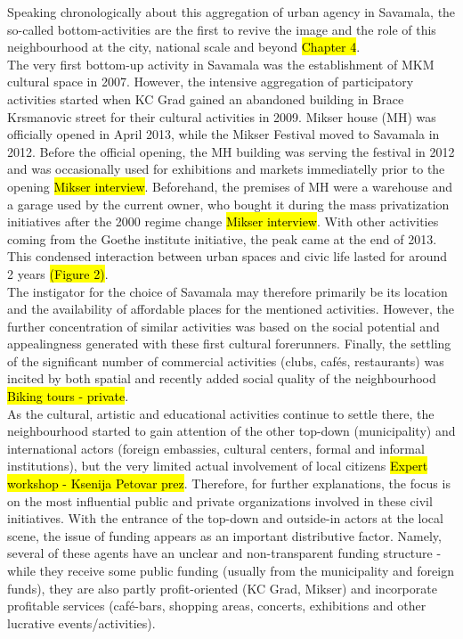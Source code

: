 \documentclass[11pt]{report}
\begin{document}
Speaking chronologically about this aggregation of urban agency in Savamala, the so-called bottom-activities are the first to revive the image and the role of this neighbourhood at the city, national scale and beyond \hl{Chapter 4}.
\\
The very first bottom-up activity in Savamala was the establishment of MKM cultural space in 2007. However, the intensive aggregation of participatory activities started when KC Grad gained an abandoned building in Brace Krsmanovic street for their cultural activities in 2009.
Mikser house (MH) was officially opened in April 2013, while the Mikser Festival moved to Savamala in 2012. Before the official opening, the MH building was serving the festival in 2012 and was occasionally used for exhibitions and markets immediatelly prior to the opening \hl{Mikser interview}.
Beforehand, the premises of MH were a warehouse and a garage used by the current owner, who bought it during the mass privatization initiatives after the 2000 regime change \hl{Mikser interview}.
With other activities coming from the Goethe institute initiative, the peak came at the end of 2013. This condensed interaction between urban spaces and civic life lasted for around 2 years \hl{(Figure 2)}.
\\
The instigator for the choice of Savamala may therefore primarily be its location and the availability of affordable places for the mentioned activities.
However, the further concentration of similar activities was based on the social potential and appealingness generated with these first cultural forerunners. Finally, the settling of the significant number of commercial activities (clubs, cafés, restaurants) was incited by both spatial and recently added social quality of the neighbourhood \hl{Biking tours - private}.
\\
As the cultural, artistic and educational activities continue to settle there, the neighbourhood started to gain attention of the other top-down (municipality) and international actors (foreign embassies, cultural centers, formal and informal institutions), but the very limited actual involvement of local citizens
\hl{Expert workshop - Ksenija Petovar prez}.
Therefore, for further explanations, the focus is on the most influential public and private organizations involved in these civil initiatives.
With the entrance of the top-down and outside-in actors at the local scene, the issue of funding appears as an important distributive factor.
Namely, several of these agents have an unclear and non-transparent funding structure - while they receive some public funding (usually from the municipality and foreign funds), they are also partly profit-oriented (KC Grad, Mikser) and incorporate profitable services (café-bars, shopping areas, concerts, exhibitions and other lucrative events/activities).
\end{document}
